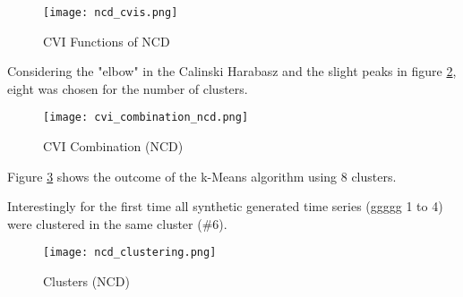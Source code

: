 \begin{figure}[h!]
	\texttt{[image: ncd\_cvis.png]}
	\caption{CVI Functions of NCD}
	\label{fig:cvi_ncd}
\end{figure}



\clearpage
Considering the "elbow" in the Calinski Harabasz and the slight peaks in figure \ref{fig:cvi_ncd_combo}, eight was chosen for the number of clusters.

\begin{figure}[h!]
	\texttt{[image: cvi\_combination\_ncd.png]}
	\caption{CVI Combination (NCD)}
	\label{fig:cvi_ncd_combo}
\end{figure}



\clearpage
Figure \ref{fig:ncd_clusters} shows the outcome of the k-Means algorithm using 8 clusters.

Interestingly for the first time all synthetic generated time series (ggggg 1 to 4) were clustered in the same cluster (\#6).

\begin{figure}[h!]
	\texttt{[image: ncd\_clustering.png]}
	\caption{Clusters (NCD)}
	\label{fig:ncd_clusters}
\end{figure}

